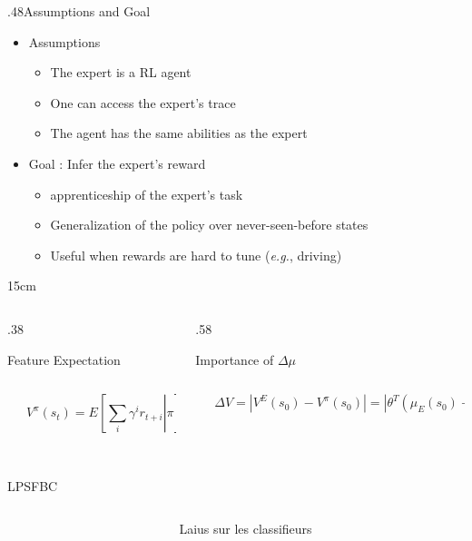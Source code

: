 \documentclass[xcolor=x11names,12pt]{beamer}
\newcommand{\TwoBoxes}[7]{%
  \begin{columns}
    \begin{column}{#1\textwidth}
      \begin{block}{#2}
        \begin{columns}
          \begin{column}{0.001\textwidth}
            \vspace{#7}
          \end{column}
          \begin{column}{\textwidth}
            \centering
            #3
          \end{column}
        \end{columns}       
      \end{block}
    \end{column}
    
    \begin{column}{#4\textwidth}
      \begin{block}{#5}
        \begin{columns}
          \begin{column}{0.001\textwidth}
            \vspace{#7}
          \end{column}
          \begin{column}{\textwidth}
            \centering
            #6
          \end{column}
        \end{columns}       
      \end{block}
    \end{column}
  \end{columns}
}
\begin{document}
\begin{frame}
{\begin{columns}
\begin{column}{.48\textwidth}
    \end{column}
  \end{columns}
}
{.48}{Assumptions and Goal}{
  \begin{itemize}
  \item Assumptions
    \begin{itemize}
    \item The expert is a RL agent
    \item One can access the expert's trace
    \item The agent has the same abilities as the expert
    \end{itemize}
  \item Goal : Infer the expert's reward
    \begin{itemize}
    \item apprenticeship of the expert's task
    \item Generalization of the policy over never-seen-before states
    \item Useful when rewards are hard to tune ({\it e.g.}, driving)
    \end{itemize}
  \end{itemize}
}
{15cm}
\vfill
\TwoBoxes{.38}{Feature Expectation}{
  \begin{equation*}
    V^\pi(s_t) = E\left[\left.\sum\limits_{i}\gamma^i r_{t+i}\right|\pi\right] = \theta^T\underbrace{E\left[\left.\sum\limits_{i}\gamma^i \phi(s_{t+i})\right|\pi\right]}_{\mu^\pi(s_t)}
  \end{equation*}
}{.58}{Importance of $\Delta \mu$}{
  \begin{equation*}
    \Delta V = |V^E(s_0) - V^\pi(s_0)| = |\theta^T\left(\mu_E(s_0) - \mu^\pi(s_0)\right)| \leq  ||\mu_E(s_0) - \mu^\pi(s_0)||_2 = \Delta\mu
  \end{equation*}
}
{6cm}
\vfill
  \begin{columns}
    \begin{column}{.48\textwidth}
    \begin{block}{LPSFBC}
      \begin{columns}
        \begin{column}{0.001\textwidth}
          \vspace{8cm}
        \end{column}
        \begin{column}{\textwidth}
          \centering
          Laius sur les classifieurs
        \end{column}
      \end{columns}       
      

\end{block}
\end{column}
\end{columns}
\end{frame}
\end{document}
